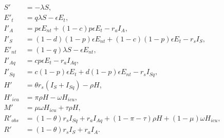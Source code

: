 \begin{equation*}
        \begin{aligned}
            S' &= -\lambda S,\\
            E'_t &= q \lambda S - \epsilon E_t,\\
            I'_A &= p \epsilon E_{nt} + (1-c)p \epsilon E_t - r_a I_A,\\
            I'_S &= (1-d)(1-p) \epsilon E_{nt} + (1-c)(1-p) \epsilon E_t - r_s I_S,\\
            E'_{nt} &= (1-q) \lambda S - \epsilon E_{nt},\\
            I'_{Aq} &= c p \epsilon E_t - r_a I_{Aq},\\
            I'_{Sq} &= c(1-p) \epsilon E_t + d (1-p) \epsilon E_{nt} - r_s I_{Sq},\\
            H' &= \theta r_s (I_S + I_{Sq}) - \rho H,\\
            H'_{icu} &= \pi \rho H - \omega H_{icu},\\
            M' &= \mu \omega H_{icu} + \tau \rho H,\\
            R'_{obs} &= (1-\theta) r_s I_{Sq} + r_a I_{Aq} + (1-\pi-\tau)\rho H + (1-\mu)\omega H_{icu},\\
            R' &= (1-\theta) r_s I_S + r_a I_A.
        \end{aligned}
\end{equation*}